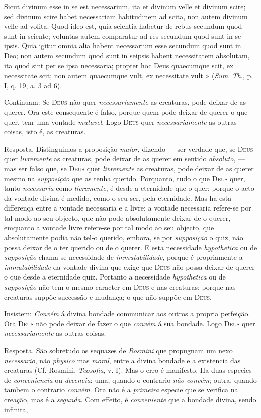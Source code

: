 Sicut divinum esse in se est necessarium, ita et divinum velle et divinum scire; sed divinum scire habet necessariam habitudinem ad scita, non autem divinum velle ad volita. Quod ideo est, quia scientia habetur de rebus secundum quod sunt in sciente; voluntas autem comparatur ad res secundum quod sunt in se ipsis. Quia igitur omnia alia habent necessarium esse secundum quod sunt in Deo; non autem secundum quod sunt in seipsis habent necessitatem absolutam, ita quod sint per se ipsa necessaria; propter hoc Deus quaecumque scit, ex necessitate scit; non autem quaecumque vult, ex necessitate vult » (\emph{Sum}. \emph{Th}., p. I, q. 19, a. 3 ad 6).\par Continuam: Se \textsc{Deus} não quer \emph{necessariamente} as creaturas, pode deixar de as querer. Ora este consequente é falso, porque quem pode deixar de querer o que quer, tem uma vontade \emph{mutavel}. Logo \textsc{Deus} quer \emph{necessariamente} as outras coisas, isto é, as creaturas.\par Resposta. Distinguimos a proposição \emph{maior}, dizendo --- ser verdade que, se \textsc{Deus} quer \emph{livremente} as creaturas, pode deixar de as querer em sentido \emph{absoluto}, --- mas ser falso que, se \textsc{Deus} quer \emph{livremente} as creaturas, pode deixar de as querer mesmo na \emph{supposição} que as tenha querido. Porquanto, tudo o que \textsc{Deus} quer, tanto \emph{necessaria} como \emph{livremente}, é desde a eternidade que o quer; porque o acto da vontade divina é medido, como o seu ser, pela eternidade. Mas ha esta differença entre a vontade necessaria e a livre: a vontade necessaria refere-se por tal modo ao seu objecto, que não pode absolutamente deixar de o querer, emquanto a vontade livre refere-se por tal modo ao seu objecto, que absolutamente podia não tel-o querido, embora, se por \emph{supposição} o quiz, não possa deixar de o ter querido ou de o querer. E esta necessidade \emph{hypothetica} ou de \emph{supposição} chama-se necessidade de \emph{immutabilidade}, porque é propriamente a \emph{immutabilidade} da vontade divina que exige que \textsc{Deus} não possa deixar de querer o que desde a eternidade quiz. Portanto a necessidade \emph{hypothetica} ou de \emph{supposição} não tem o mesmo caracter em \textsc{Deus} e nas creaturas; porque nas creaturas suppõe successão e mudança; o que não suppõe em \textsc{Deus}.\par Insistem: \emph{Convém} á divina bondade communicar aos outros a propria perfeição. Ora \textsc{Deus} não pode deixar de fazer o que \emph{convém} á sua bondade. Logo \textsc{Deus} quer \emph{necessariamente} as outras coisas.\par Resposta. São sobretudo os sequazes de \emph{Rosmini} que propugnam um nexo \emph{necessario}, não \emph{physico} mas \emph{moral}, entre a divina bondade e a existencia das creaturas (Cf. Rosmini, \emph{Teosofia}, v. I). Mas o erro é manifesto. Ha duas especies de \emph{conveniencia} ou \emph{decencia}: uma, quando o contrario \emph{não convém}; outra, quando tambem o contrario \emph{convém}. Ora não é a \emph{primeira} especie que se verifica na creação, mas é a \emph{segunda}. Com effeito, é \emph{conveniente} que a bondade divina, sendo infinita, 